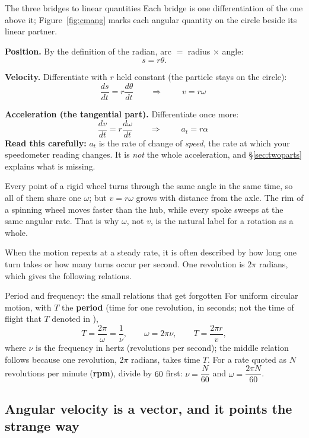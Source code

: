 \begin{derivbox}{The three bridges to linear quantities}
Each bridge is one differentiation of the one above it; Figure~\ref{fig:cmang} marks each angular
quantity on the circle beside its linear partner.

 \textbf{Position.} By the definition of the radian, arc $=$ radius $\times$ angle:
\[ s=r\theta. \]

 \textbf{Velocity.} Differentiate with $r$ held constant (the particle stays on the circle):
\[
\frac{ds}{dt}=r\frac{d\theta}{dt}
\qquad\Longrightarrow\qquad
\boxed{\;v=r\omega\;}
\]

 \textbf{Acceleration (the tangential part).} Differentiate once more:
\[
\frac{dv}{dt}=r\frac{d\omega}{dt}
\qquad\Longrightarrow\qquad
\boxed{\;a_t=r\alpha\;}
\]
\textbf{Read this carefully:} $a_t$ is the rate of change of \emph{speed}, the rate at which your
speedometer reading changes. It is \emph{not} the whole acceleration, and \S\ref{sec:twoparts} explains what is missing.
\end{derivbox}

Every point of a rigid wheel turns through the same angle in the same time, so all of them share one
$\omega$; but $v=r\omega$ grows with distance from the axle. The rim of a spinning wheel moves faster
than the hub, while every spoke sweeps at the same angular rate. That is why $\omega$, not $v$, is the
natural label for a rotation as a whole.

When the motion repeats at a steady rate, it is often described by how long one turn takes or how many
turns occur per second. One revolution is $2\pi$ radians, which gives the following relations.

\begin{keybox}{Period and frequency: the small relations that get forgotten}
For uniform circular motion, with $T$ the \textbf{period} (time for one revolution, in seconds; not
the time of flight that $T$ denoted in ),
\[
T=\frac{2\pi}{\omega}=\frac{1}{\nu},
\qquad
\omega=2\pi\nu,
\qquad
T=\frac{2\pi r}{v},
\]
where $\nu$ is the frequency in hertz (revolutions per second); the middle relation follows because one
revolution, $2\pi$ radians, takes time $T$. For a rate quoted as $N$ revolutions per minute (\textbf{rpm}),
divide by $60$ first: $\nu=\dfrac{N}{60}$ and $\omega=\dfrac{2\pi N}{60}$.
\end{keybox}

\subsection{Angular velocity is a vector, and it points the strange way}

